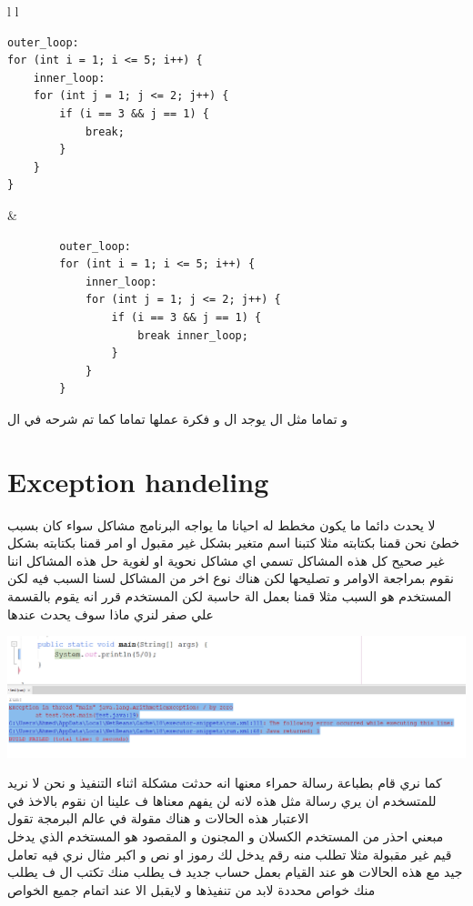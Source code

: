     \begin{tabular}{l l}
    \begin{minipage}[t]{0.5\textwidth}
    \begin{verbatim}
outer_loop:
for (int i = 1; i <= 5; i++) {
    inner_loop:
    for (int j = 1; j <= 2; j++) {
        if (i == 3 && j == 1) {
            break;
        }
    }
}
    \end{verbatim}
    \end{minipage}
    &
    \begin{minipage}[t]{0.4\textwidth}
      \begin{verbatim}
        outer_loop:
        for (int i = 1; i <= 5; i++) {
            inner_loop:
            for (int j = 1; j <= 2; j++) {
                if (i == 3 && j == 1) {
                    break inner_loop;
                }
            }
        }
      \end{verbatim}
      \end{minipage}
    

  \end{tabular}


  \begin{AR}
    و تماما مثل ال  يوجد ال  و فكرة عملها تماما كما تم شرحه في ال 
  \end{AR}

\section{Exception handeling}
\begin{AR}
  لا يحدث دائما ما يكون مخطط له احيانا ما يواجه البرنامج مشاكل سواء كان
  بسبب خطئ نحن قمنا بكتابته مثلا كتبنا اسم متغير بشكل غير مقبول او
  امر قمنا بكتابته بشكل غير صحيح كل هذه المشاكل تسمي  
  اي مشاكل نحوية او لغوية حل هذه المشاكل اننا نقوم بمراجعة الاوامر و تصليحها 
  لكن هناك نوع اخر من المشاكل لسنا السبب فيه لكن المستخدم هو السبب مثلا قمنا بعمل الة حاسبة لكن المستخدم قرر انه يقوم 
  بالقسمة علي صفر لنري ماذا سوف يحدث عندها 
\end{AR}
\includegraphics[scale=.4]{exp.png}
\begin{AR}
  كما نري قام بطباعة رسالة حمراء معنها انه حدثت مشكلة اثناء التنفيذ 
  و نحن لا نريد للمتسخدم ان يري رسالة مثل هذه لانه لن يفهم معناها ف علينا ان 
  نقوم بالاخذ في الاعتبار هذه الحالات و هناك مقولة في عالم البرمجة
  تقول 
  \\
  مبعني احذر من المستخدم الكسلان و المجنون 
  و المقصود هو المستخدم الذي يدخل قيم غير مقبولة مثلا تطلب منه رقم يدخل لك 
  رموز او نص
  و اكبر مثال نري فيه تعامل جيد مع هذه الحالات هو عند القيام بعمل 
  حساب جديد ف يطلب منك تكتب ال ف يطلب منك خواص محددة لابد من تنفيذها و لايقبل الا عند اتمام جميع الخواص 
\end{AR}
